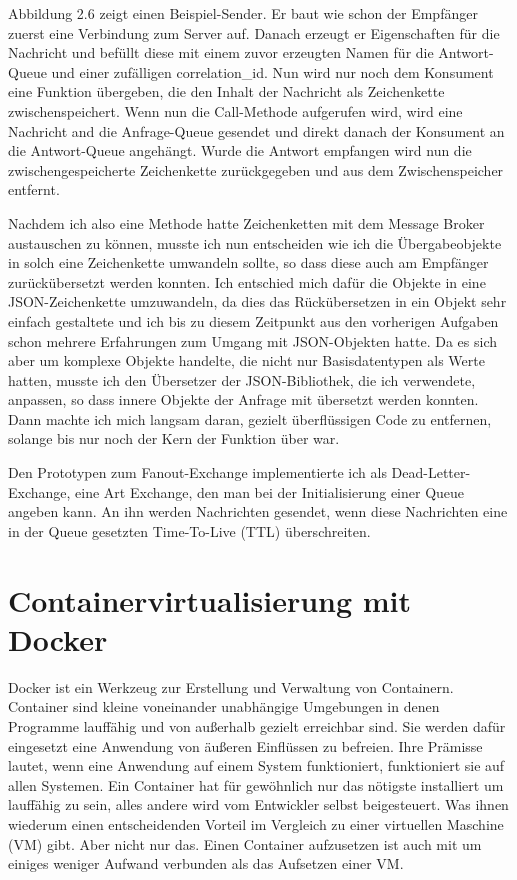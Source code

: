 \documentclass[12pt,a4paper]{scrartcl}
\begin{document}
Abbildung 2.6 zeigt einen Beispiel-Sender. Er baut wie schon der Empfänger zuerst eine Verbindung zum Server auf. Danach erzeugt er Eigenschaften für die Nachricht und befüllt diese mit einem zuvor erzeugten Namen für die Antwort-Queue und einer zufälligen correlation\_id. Nun wird nur noch dem Konsument eine Funktion übergeben, die den Inhalt der Nachricht als Zeichenkette zwischenspeichert. Wenn nun die Call-Methode aufgerufen wird, wird eine Nachricht and die Anfrage-Queue gesendet und direkt danach der Konsument an die Antwort-Queue angehängt. Wurde die Antwort empfangen wird nun die zwischengespeicherte Zeichenkette zurückgegeben und aus dem Zwischenspeicher entfernt.

Nachdem ich also eine Methode hatte Zeichenketten mit dem Message Broker austauschen zu können, musste ich nun entscheiden wie ich die Übergabeobjekte in solch eine Zeichenkette umwandeln sollte, so dass diese auch am Empfänger zurückübersetzt werden konnten.
Ich entschied mich dafür die Objekte in eine JSON-Zeichenkette umzuwandeln, da dies das Rückübersetzen in ein Objekt sehr einfach gestaltete und ich bis zu diesem Zeitpunkt aus den vorherigen Aufgaben schon mehrere Erfahrungen zum Umgang mit JSON-Objekten hatte. 
Da es sich aber um komplexe Objekte handelte, die nicht nur Basisdatentypen als Werte hatten, musste ich den Übersetzer der JSON-Bibliothek, die ich verwendete, anpassen, so dass innere Objekte der Anfrage mit übersetzt werden konnten. 
Dann machte ich mich langsam daran, gezielt überflüssigen Code zu entfernen, solange bis nur noch der Kern der Funktion über war.

Den Prototypen zum Fanout-Exchange implementierte ich als Dead-Letter-Exchange, eine Art Exchange, den man bei der Initialisierung einer Queue angeben kann. An ihn werden Nachrichten gesendet, wenn diese Nachrichten eine in der Queue gesetzten Time-To-Live (TTL) überschreiten.


\newpage
\section{Containervirtualisierung mit Docker} \label{docker}
Docker ist ein Werkzeug zur Erstellung und Verwaltung von Containern. 
Container sind kleine voneinander unabhängige Umgebungen in denen Programme lauffähig und von außerhalb gezielt erreichbar sind. Sie werden dafür eingesetzt eine Anwendung von äußeren Einflüssen zu befreien. Ihre Prämisse lautet, wenn eine Anwendung auf einem System funktioniert, funktioniert sie auf allen Systemen. Ein Container hat für gewöhnlich nur das nötigste installiert um lauffähig zu sein, alles andere wird vom Entwickler selbst beigesteuert. Was ihnen wiederum einen entscheidenden Vorteil im Vergleich zu einer virtuellen Maschine (VM) gibt. Aber nicht nur das. Einen Container aufzusetzen ist auch mit um einiges weniger Aufwand verbunden als das Aufsetzen einer VM. 
\end{document}

